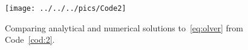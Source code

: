 \documentclass[%
secnumarabic,%
 amssymb, amsmath,%
 aps,prf,superscriptaddress,longbibliography
frontmatterverbose,
]{revtex4-2}
\begin{document}
\begin{figure}
  \centering
  \texttt{[image: ../../../pics/Code2]}
  \caption{\label{fig:1} Comparing analytical and numerical solutions to~\eqref{eq:olver} from Code~\ref{cod:2}.}
\end{figure}
\end{document}
